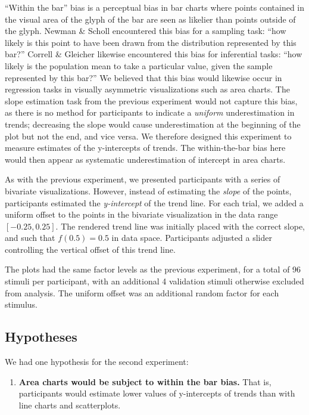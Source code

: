 \documentclass{sigchi}
\begin{document}
``Within the bar'' bias is a perceptual bias in bar charts where points contained in the visual area of the glyph of the bar are seen as likelier than points outside of the glyph. Newman \& Scholl \cite{newman2012bar} encountered this bias for a sampling task: ``how likely is this point to have been drawn from the distribution represented by this bar?'' Correll \& Gleicher \cite{correll2014error} likewise encountered this bias for inferential tasks: ``how likely is the population mean to take a particular value, given the sample represented by this bar?'' We believed that this bias would likewise occur in regression tasks in visually asymmetric visualizations such as area charts. The slope estimation task from the previous experiment would not capture this bias, as there is no method for participants to indicate a \emph{uniform} underestimation in trends; decreasing the slope would cause underestimation at the beginning of the plot but not the end, and vice versa. We therefore designed this experiment to measure estimates of the y-intercepts of trends. The within-the-bar bias here would then appear as systematic underestimation of intercept in area charts.

As with the previous experiment, we presented participants with a series of bivariate visualizations. However, instead of estimating the \emph{slope} of the points, participants estimated the \emph{y-intercept} of the trend line. For each trial, we added a uniform offset to the points in the bivariate visualization in the data range $[-0.25,0.25]$. The rendered trend line was initially placed with the correct slope, and such that $f(0.5)=0.5$ in data space. Participants adjusted a slider controlling the vertical offset of this trend line.

The plots had the same factor levels as the previous experiment, for a total of 96 stimuli per participant, with an additional 4 validation stimuli otherwise excluded from analysis. The uniform offset was an additional random factor for each stimulus.

\subsection{Hypotheses}

We had one hypothesis for the second experiment:
\begin{enumerate}
	\item \textbf{Area charts would be subject to within the bar bias.} That is, participants would estimate lower values of y-intercepts of trends than with line charts and scatterplots.
\end{enumerate}
\end{document}
